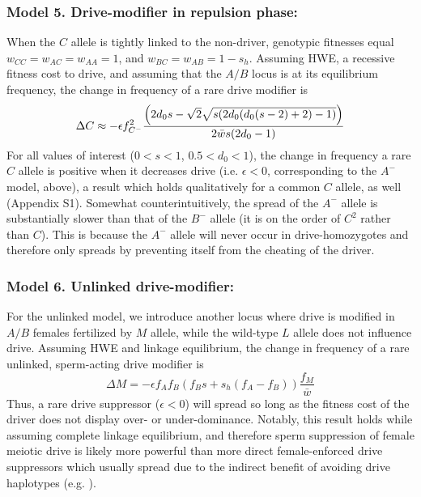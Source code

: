 \documentclass{pnastwo}
\begin{document}
\begin{article}
 \subsubsection{Model 5. Drive-modifier in repulsion phase:}
When the $C$ allele is tightly linked to the non-driver, 
	genotypic fitnesses equal $w_{CC}=w_{AC}=w_{AA}=1$, and $w_{BC}=w_{AB}=1-s_h$. 
Assuming HWE, a recessive fitness cost to drive, and assuming that the $A/B$ locus is at its equilibrium frequency, the change in frequency of a rare drive modifier is
\begin{equation}
	\Delta C \approx -\epsilon f_{C^-}^2 \frac{ \left(2 d_0 s-\sqrt{2} \\ \sqrt{s (2 d_0 (d_0 (s-2)+2)-1)}\right)}{2\bar{w}s (2 d_0 -1) } \label{A-}
\end{equation}
For all values of interest ($0<s<1$, $0.5<d_0<1$), the change in frequency a rare $C$ allele is positive when it decreases drive (i.e. $\epsilon <0$, corresponding to the $A^-$ model, above), a result which holds qualitatively for a common $C$ allele, as well (Appendix S1). 
Somewhat counterintuitively, the spread of the $A^-$ allele is substantially slower than that of the $B^-$ allele (it is on the order of $C^{2}$ rather than $C$). 
This is because the $A^-$ allele will never occur in drive-homozygotes and therefore only spreads by preventing itself from the cheating of the driver.

\subsubsection*{Model 6. Unlinked drive-modifier:}
For the unlinked model, we introduce another locus where drive is modified in $A/B$ females fertilized by $M$ allele, 
	while the wild-type $L$ allele does not influence drive. 
Assuming HWE and linkage equilibrium, the change in frequency of a rare unlinked, sperm-acting drive modifier is 
\begin{equation} \Delta M =-\epsilon f_A f_B (f_B s + s_h (f_A - f_B) ) \frac{f_M}{\bar{w}}  \label{unlinked} \end{equation}
Thus, a rare drive suppressor ($\epsilon<0$) will spread so long as the fitness cost of the driver does not display over- or under-dominance. 
Notably, this result holds while assuming complete linkage equilibrium, and therefore sperm suppression of female meiotic drive is likely more powerful than more direct female-enforced drive suppressors  which usually spread due to the indirect benefit of avoiding drive haplotypes (e.g. \cite{Brandvain2012}).  
 
\begin{acknowledgments} \end{acknowledgments}
%

\end{article}
\end{document}

